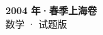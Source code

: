 \documentclass[zihao=-4, a4paper]{ctexart}
\begin{document}
\begin{center}
  {\Large\bfseries 2004 年·春季上海卷}\\[4pt]
  {\large 数学 · 试题版}
\end{center}
\medskip
{}

\end{document}
